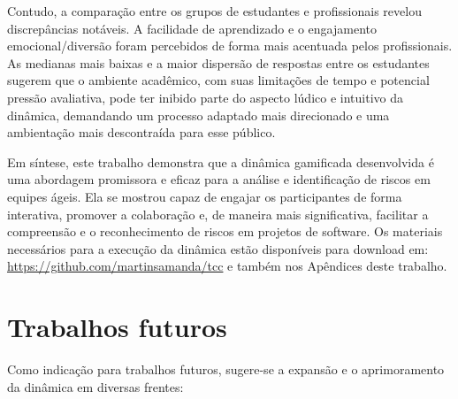 \documentclass[
	12pt,
	openright,
	twoside,
	a4paper,
	english,
	brazil
	]{abntex2}
\begin{document}
Contudo, a comparação entre os grupos de estudantes e profissionais revelou discrepâncias notáveis. A facilidade de aprendizado e o engajamento emocional/diversão foram percebidos de forma mais acentuada pelos profissionais. As medianas mais baixas e a maior dispersão de respostas entre os estudantes sugerem que o ambiente acadêmico, com suas limitações de tempo e potencial pressão avaliativa, pode ter inibido parte do aspecto lúdico e intuitivo da dinâmica, demandando um processo adaptado mais direcionado e uma ambientação mais descontraída para esse público.

Em síntese, este trabalho demonstra que a dinâmica gamificada desenvolvida é uma abordagem promissora e eficaz para a análise e identificação de riscos em equipes ágeis. Ela se mostrou capaz de engajar os participantes de forma interativa, promover a colaboração e, de maneira mais significativa, facilitar a compreensão e o reconhecimento de riscos em projetos de software. Os materiais necessários para a execução da dinâmica estão disponíveis para download em: \url{https://github.com/martinsamanda/tcc} e também nos Apêndices deste trabalho.

\section{Trabalhos futuros}
\label{sec:trabalhos-futuros}

Como indicação para trabalhos futuros, sugere-se a expansão e o aprimoramento da dinâmica em diversas frentes:
\end{document}

